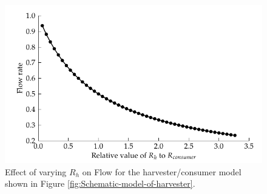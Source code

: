 \begin{figure} \begin{centering}
        \includegraphics{content/pt1/01-PowerHarvesting/graphics/streamingCell_consumerModel_flow}
        \par\end{centering}

\protect\caption{\label{fig:Effect-of-varying-Rh-onFlow}Effect of varying
    $R_{h}$ on Flow for the harvester/consumer model shown in Figure
    \ref{fig:Schematic-model-of-harvester}.} \end{figure}


